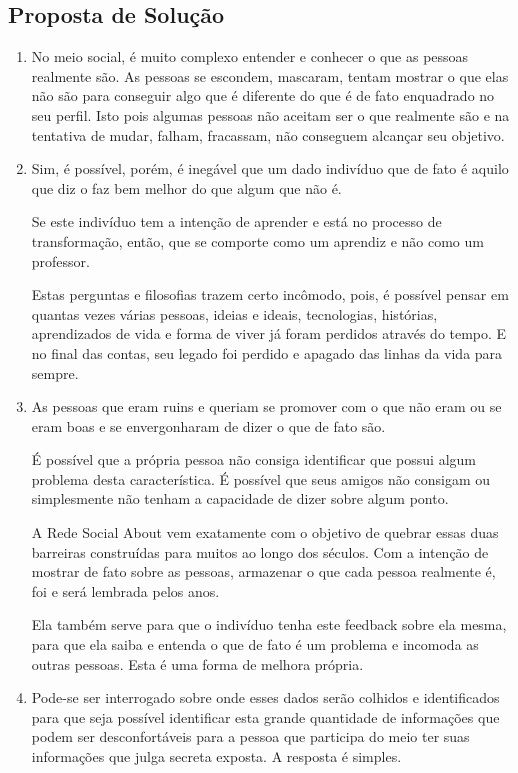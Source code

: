 \subsection{Proposta de Solução}
\label{sub:propostadesolucao}

\begin{enumerate}
    \item No meio social, é muito complexo entender e conhecer o que as 
        pessoas
        realmente são. As pessoas se escondem, mascaram, tentam mostrar o que elas não
        são para conseguir algo que é diferente do que é de fato enquadrado no seu
        perfil. Isto pois algumas pessoas não aceitam ser o que realmente são e na
        tentativa de mudar, falham, fracassam, não conseguem alcançar seu objetivo.

    \item Sim, é possível, porém, é inegável que um
        dado indivíduo que de fato é aquilo que diz o faz bem melhor do que algum
        que não é.

        Se este indivíduo tem a intenção de aprender e está no processo de transformação,
        então, que se comporte como um aprendiz e não como um professor.

        Estas perguntas e filosofias trazem certo incômodo, pois, é possível pensar em quantas 
        vezes várias
        pessoas, ideias e ideais, tecnologias, histórias, aprendizados de vida e forma de
        viver já foram perdidos através do tempo. E no final das contas, seu legado foi
        perdido e apagado das linhas da vida para sempre.

    \item As pessoas que eram ruins e queriam se promover com o que não eram 
        ou se eram boas e se envergonharam de dizer o que de fato são.

        É possível que a própria pessoa não consiga identificar que possui algum problema
        desta característica. É possível que seus amigos não
        consigam ou simplesmente não tenham a capacidade de dizer sobre algum ponto.

        A Rede Social About vem exatamente com o objetivo de quebrar essas duas barreiras construídas
        para muitos ao longo dos séculos. Com a intenção de mostrar de fato sobre as pessoas,
        armazenar o que cada pessoa realmente é, foi e será lembrada pelos anos.

        Ela também serve para que o indivíduo tenha este feedback sobre ela mesma, para que ela
        saiba e entenda o que de fato é um problema e incomoda as outras pessoas. Esta é uma forma
        de melhora própria. 
    \item Pode-se ser interrogado sobre onde esses dados serão colhidos e identificados para que seja
        possível identificar esta grande quantidade de informações que podem ser desconfortáveis
        para a pessoa que participa do meio ter suas informações que julga secreta exposta. A resposta
        é simples.


\end{enumerate}
